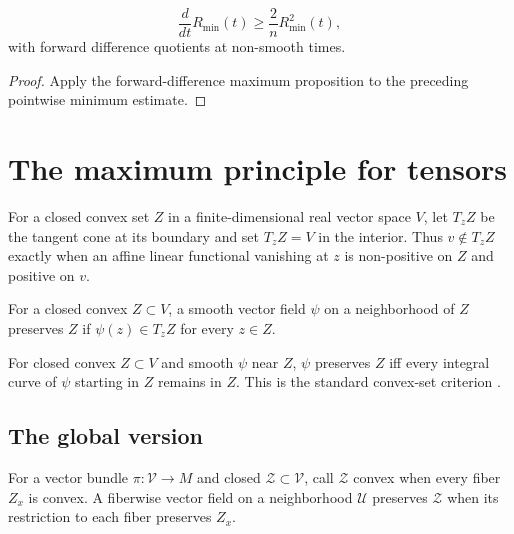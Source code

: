 \begin{claim}
\label{claim:scalar-min-forward-difference}


\label{Rminprime}
\[
\frac{d}{dt}R_\mathrm{min}(t)\ge\frac{2}{n}R_\mathrm{min}^2(t),
\]
with forward difference quotients at non-smooth times.
\end{claim}
\begin{proof}
\sketch Apply the forward-difference maximum proposition to the preceding
pointwise minimum estimate.
\end{proof}

\section{The maximum principle for tensors}

For a closed convex set $Z$ in a finite-dimensional real vector space $V$,
let $T_zZ$ be the tangent cone at its boundary and set $T_zZ=V$ in the
interior. Thus $v\notin T_zZ$ exactly when an affine linear functional
vanishing at $z$ is non-positive on $Z$ and positive on $v$.

\begin{definition}
\label{def:vector-field-preserves-convex-set}
For a closed convex $Z\subset V$, a smooth vector field $\psi$ on a
neighborhood of $Z$ preserves $Z$ if $\psi(z)\in T_zZ$ for every $z\in Z$.
\end{definition}

\begin{lemma}
\label{lem:integral-curve-preserves-convex-set}

For closed convex $Z\subset V$ and smooth $\psi$ near $Z$, $\psi$ preserves
$Z$ iff every integral curve of $\psi$ starting in $Z$ remains in $Z$.
This is the standard convex-set criterion \cite{Hamilton4MPCO}.
\end{lemma}

\subsection{The global version}\label{4.3.3}

\begin{definition}
\label{def:convex-subbundle-preserving-vector-field}

For a vector bundle $\pi:{\mathcal V}\to M$ and closed ${\mathcal Z}\subset
{\mathcal V}$, call ${\mathcal Z}$ convex when every fiber $Z_x$ is convex.
A fiberwise vector field on a neighborhood ${\mathcal U}$ preserves ${\mathcal Z}$
when its restriction to each fiber preserves $Z_x$.
\end{definition}

